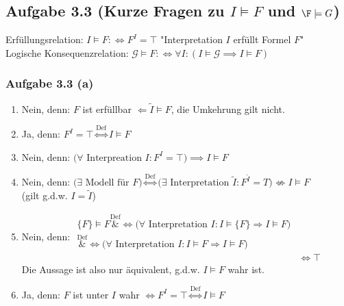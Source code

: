 \subsection{Aufgabe 3.3  (Kurze Fragen zu \texorpdfstring{$I\models F$}{I |= F} und \texorpdfstring{$\F\models G$}{F |= G})}
Erfüllungsrelation: $I\models F:\Longleftrightarrow F^I=\top$ "Interpretation $I$ erfüllt Formel $F$"\\
Logische Konsequenzrelation: $\mathcal{G}\models F:\Longleftrightarrow\forall I:(I\models\mathcal{G}\implies I\models F)$

\subsubsection{Aufgabe 3.3 (a)}
\begin{enumerate}[label=(\arabic*)]
	\item Nein, denn: $F$ ist erfüllbar $\Longleftarrow \tilde{I}\models F$, die Umkehrung gilt nicht.
	\item Ja, denn: $F^I=\top\stackrel{\text{Def}}{\Longleftrightarrow} I\models F$
	\item Nein, denn: $\big(\forall\text{ Interpreation }I:F^I=\top\big)\implies I\models F$
	\item Nein, denn: $\Big(\exists\text{ Modell für }F \Big)
		\stackrel{\text{Def}}{\Longleftrightarrow}
		\Big(\exists\text{ Interpretation }\tilde{I}:F^{\tilde{I}}=T\big)\not\Longleftrightarrow I\models F$\\
		(gilt g.d.w. $I=\tilde{I}$)
	\item Nein, denn: $\begin{aligned}
		\lbrace F\rbrace\models F
		\overset{\text{Def}}&{\Longleftrightarrow}
		\big(\forall\text{ Interpretation }I:I\models\lbrace F\rbrace\Rightarrow I\models F\big)\\
		\overset{\text{Def}}&{\Longleftrightarrow}
		\big(\forall\text{ Interpretation }I:I\models F\Rightarrow I\models F\big)\\
		&\Longleftrightarrow\top
	\end{aligned}$\\
	Die Aussage ist also nur äquivalent, g.d.w. $I\models F$ wahr ist.
	\item Ja, denn: $F$ ist unter $I$ wahr $\Longleftrightarrow F^I=\top\stackrel{\text{Def}}{\Longleftrightarrow} I\models F$
\end{enumerate}

